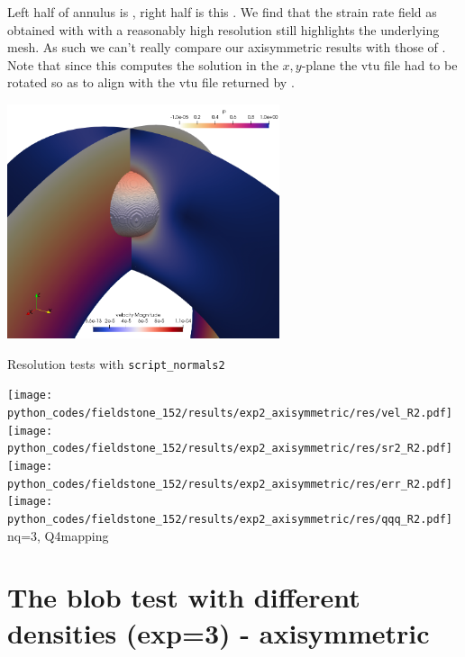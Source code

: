 \begin{center}
{\captionfont Left half of annulus is \aspect, right half is this \stone. 
We find that the strain rate field as obtained with \aspect with a reasonably high 
resolution still highlights the underlying mesh. As such we can't really compare our axisymmetric 
results with those of \aspect. Note that since this \stone computes the solution in the 
$x,y$-plane the vtu file had to be rotated so as to align with the vtu file returned by \aspect.}
\end{center}

\begin{center}
\includegraphics[width=8cm]{python_codes/fieldstone_152/results/exp2_axisymmetric/aspect/sols}
\end{center}

\vspace{2cm}

Resolution tests with {\tt script\_normals2}


\begin{center}
\texttt{[image: python\_codes/fieldstone\_152/results/exp2\_axisymmetric/res/vel\_R2.pdf]}
\texttt{[image: python\_codes/fieldstone\_152/results/exp2\_axisymmetric/res/sr2\_R2.pdf]}\\
\texttt{[image: python\_codes/fieldstone\_152/results/exp2\_axisymmetric/res/err\_R2.pdf]}
\texttt{[image: python\_codes/fieldstone\_152/results/exp2\_axisymmetric/res/qqq\_R2.pdf]}\\
{\captionfont nq=3, Q4mapping}
\end{center}







\newpage
\section*{The blob test with different densities (exp=3) - axisymmetric}

